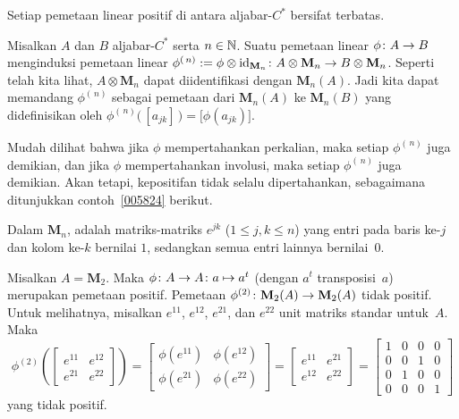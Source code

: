 \begin{prop} Setiap pemetaan linear positif di antara aljabar-$C^*$ bersifat terbatas.
\end{prop}

\begin{notn} Misalkan $A$ dan $B$ aljabar-$C^*$ serta $n \in \mathbb{N}$. Suatu pemetaan linear $\phi\colon A \rightarrow
B$ menginduksi pemetaan linear $\phi^{(\,n)} := \phi \otimes \operatorname{id}_{\mathbf M_n}\colon A \otimes
\mathbf M_n \rightarrow B \otimes \mathbf M_n$. Seperti telah kita lihat, $A \otimes \mathbf M_n$ dapat
diidentifikasi dengan $\mathbf M_n(A)$. Jadi kita dapat memandang $\phi^{(\,n)}$ sebagai pemetaan dari
$\mathbf M_n(A)$ ke $\mathbf M_n(B)$ yang didefinisikan oleh $\phi^{(\,n)}\big(\,[a_{jk}]\,\bigr) =
\bigl[ \phi(a_{jk})\bigr]$.
\end{notn}

Mudah dilihat bahwa jika $\phi$ mempertahankan perkalian, maka setiap $\phi^{(\,n)}$ juga demikian,
dan jika $\phi$ mempertahankan involusi, maka setiap $\phi^{(\,n)}$ juga demikian.
Akan tetapi, kepositifan tidak selalu dipertahankan, sebagaimana ditunjukkan contoh~\ref{005824} berikut.

\begin{defn} Dalam $\mathbf M_n$,
 adalah matriks-matriks $e^{jk}$ ($1 \le j,k \le n$) yang entri pada
baris ke-$j$ dan kolom ke-$k$ bernilai $1$, sedangkan semua entri lainnya
bernilai~$0$.
\end{defn}

\begin{exam}\label{005824} Misalkan $A = \mathbf M_2$. Maka $\phi\colon A \rightarrow A\colon a \mapsto a^t$
(dengan $a^t$ transposisi~$a$) merupakan pemetaan positif. Pemetaan $\phi^{(2)}\colon
\mathbf M_2(A) \rightarrow \mathbf M_2(A)$ tidak positif. Untuk melihatnya, misalkan $e^{11}$, $e^{12}$,
$e^{21}$, dan $e^{22}$ unit matriks standar untuk~$A$. Maka
  \[ \phi^{(2)}\left(\begin{bmatrix} e^{11} & e^{12} \\ e^{21} & e^{22} \end{bmatrix}\right)
    = \begin{bmatrix} \phi(e^{11}) & \phi(e^{12}) \\ \phi(e^{21}) & \phi(e^{22}) \end{bmatrix}
    = \begin{bmatrix} e^{11} & e^{21} \\ e^{12} & e^{22} \end{bmatrix}
    = \begin{bmatrix} 1 & 0 & 0 & 0 \\
                      0 & 0 & 1 & 0 \\
                      0 & 1 & 0 & 0 \\
                      0 & 0 & 0 & 1
      \end{bmatrix} \]
yang tidak positif.
\end{exam}

